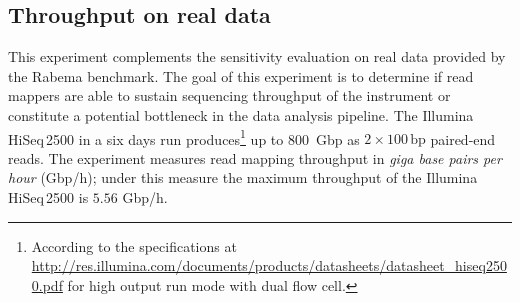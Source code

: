 

\begin{table*}[t]
  \caption[Yara results in the Rabema benchmark]
  {
  \label{tab:yara:rabema}
    Rabema benchmark results on the human whole genome.
    The left panel shows the results of mapping $1\,\text{M}$ Illumina-like $2 \times 100\,\text{bp}$ simulated reads; the right panel shows the results of mapping $1\,\text{M}$ Illumina $2 \times 100\,\text{bp}$ real reads.
    Big numbers show total Rabema scores, while small numbers show marginal scores for the mapping locations at
    $\bigl(\begin{smallmatrix}\mbox{\tiny 0}&\mbox{\tiny 1}&\mbox{\tiny 2}\\\mbox{\tiny 3}&\mbox{\tiny 4}&\mbox{\tiny 5}\end{smallmatrix}\bigr)$ \% error rate.
    }
  \vspace{-3mm}
  \center
  \sffamily
  \resizebox{0.95\textwidth}{!}
  {
	\renewcommand{\tabcolsep}{0.8ex}
	
  }
\end{table*}


\subsection{Throughput on real data}

This experiment complements the sensitivity evaluation on real data provided by the Rabema benchmark.
The goal of this experiment is to determine if read mappers are able to sustain sequencing throughput of the instrument or constitute a potential bottleneck in the data analysis pipeline.
The Illumina HiSeq\,2500 in a six days run produces\footnote{According to the specifications at \url{http://res.illumina.com/documents/products/datasheets/datasheet_hiseq2500.pdf} for high output run mode with dual flow cell.} up to 800~Gbp as $2 \times 100\,\text{bp}$ paired-end reads.
The experiment measures read mapping throughput in \emph{giga base pairs per hour} (Gbp/h); under this measure the maximum throughput of the Illumina HiSeq\,2500 is $5.56$ Gbp/h.

